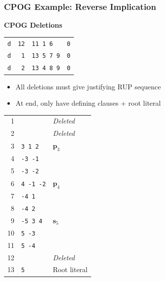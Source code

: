 \documentclass[t,pdf]{beamer}
\newcommand{\makenode}[1]{{\mathbf #1}}
\newcommand{\nodes}{\makenode{s}}
\newcommand{\nodep}{\makenode{p}}
\newcommand{\rtext}[1]{\textcolor{xred}{#1}}
\newcommand{\gtext}[1]{\textcolor{xgreen}{#1}}
\begin{document}
\begin{frame}
  \frametitle{CPOG Example: Reverse Implication}

\medskip

\begin{minipage}{0.58\textwidth}
  {\bf CPOG Deletions}\\[0.5em]
  \begin{tabular}{lrll}
  \midrule
  \texttt{d} & \texttt{\rtext{12}} & \texttt{\rtext{11 1 6}} & \texttt{0} \\
  \texttt{d} & \texttt{\rtext{1}} & \texttt{\rtext{13 5 7 9}} & \texttt{0} \\
  \texttt{d} & \texttt{\rtext{2}} & \texttt{\rtext{13 4 8 9}} & \texttt{0} \\
  \bottomrule
  \end{tabular}

  \medskip

  \begin{itemize}
    \item All deletions must give justifying RUP sequence
    \item At end, only have defining clauses + root literal
  \end{itemize}

\end{minipage}
\begin{minipage}{0.4\textwidth}
\begin{tabular}{rll}
\midrule
  \rtext{1} &  &  \emph{Deleted} \\
  \rtext{2} &  &  \emph{Deleted} \\
\midrule
  \rtext{3} & \gtext{\texttt{3 1 2}} &  $\nodep_3$ \\
  \rtext{4} & \gtext{\texttt{-3 -1}} &   \\
  \rtext{5} & \gtext{\texttt{-3 -2}} &   \\
  \midrule
  \rtext{6} & \gtext{\texttt{4 -1 -2}} &  $\nodep_4$ \\
  \rtext{7} & \gtext{\texttt{-4 1}} &   \\
  \rtext{8} & \gtext{\texttt{-4 2}} &   \\
  \midrule
  \rtext{9} & \gtext{\texttt{-5 3 4}} &  $\nodes_5$ \\
  \rtext{10} & \gtext{\texttt{5 -3}} &   \\
  \rtext{11} & \gtext{\texttt{5 -4}} &   \\
\midrule
  \rtext{12} &  &   \emph{Deleted} \\
  \rtext{13} & \gtext{\texttt{5}} &   Root literal \\
\bottomrule
\end{tabular}
\end{minipage}
\end{frame}
\end{document}
